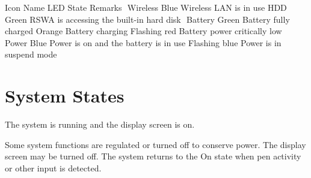 \startplacetable[title={System status indicators}]
\startxtable
\startxtablehead
\startxrow[head]
\startxcell[align=center]
​Icon
\stopxcell
\startxcell
Name
\stopxcell
\startxcell
LED State
\stopxcell
\startxcell
Remarks
\stopxcell
\stopxrow
\stopxtablehead
\startxtablebody
\startxrow[body]
\startxcell[align=center]
​{}
\stopxcell
\startxcell
Wireless
\stopxcell
\startxcell
Blue
\stopxcell
\startxcell
Wireless LAN is in use
\stopxcell
\stopxrow
\startxrow[body]
\startxcell[align=center]
​{}
\stopxcell
\startxcell
HDD
\stopxcell
\startxcell
Green
\stopxcell
\startxcell
RSWA is accessing the built-in hard disk
\stopxcell
\stopxrow
\startxrow[body]
\startxcell[align=center]
​{}
\stopxcell
\startxcell
Battery
\stopxcell
\startxcell
Green
\stopxcell
\startxcell
Battery fully charged
\stopxcell
\stopxrow
\startxrow[body]
\startxcell[align=center]
\stopxcell
\startxcell
\stopxcell
\startxcell
Orange
\stopxcell
\startxcell
Battery charging
\stopxcell
\stopxrow
\startxrow[body]
\startxcell[align=center]
\stopxcell
\startxcell
\stopxcell
\startxcell
Flashing red
\stopxcell
\startxcell
Battery power critically low
\stopxcell
\stopxrow
\startxrow[body]
\startxcell[align=center]
​{}
\stopxcell
\startxcell
Power
\stopxcell
\startxcell
Blue
\stopxcell
\startxcell
Power is on and the battery is in use
\stopxcell
\stopxrow
\startxrow[lastbody]
\startxcell[align=center]
\stopxcell
\startxcell
\stopxcell
\startxcell
Flashing blue
\stopxcell
\startxcell
Power is in suspend mode
\stopxcell
\stopxrow
\stopxtablebody
\stopxtable
\stopplacetable

\section[system-states]{System States}

The system is running and the display screen is on.
\stopdescription

Some system functions are regulated or turned off to conserve power. The
display screen may be turned off. The system returns to the On state when
pen activity or other input is detected.
\stopdescription

